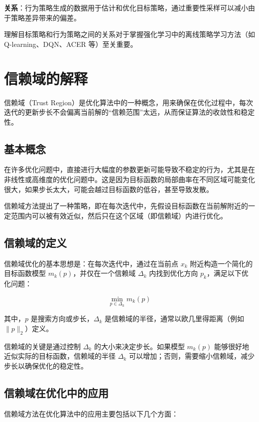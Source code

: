 \documentclass[twocolumn, 10pt]{article} %
\theoremstyle{remark}
\begin{document}
\textbf{关系}：行为策略生成的数据用于估计和优化目标策略，通过重要性采样可以减小由于策略差异带来的偏差。

理解目标策略和行为策略之间的关系对于掌握强化学习中的离线策略学习方法（如 Q-learning、DQN、ACER 等）至关重要。



\section{信赖域的解释}

信赖域（Trust Region）是优化算法中的一种概念，用来确保在优化过程中，每次迭代的更新步长不会偏离当前解的“信赖范围”太远，从而保证算法的收敛性和稳定性。

\subsection{基本概念}

在许多优化问题中，直接进行大幅度的参数更新可能导致不稳定的行为，尤其是在非线性或高维度的优化问题中。这是因为目标函数的局部曲率在不同区域可能变化很大，如果步长太大，可能会越过目标函数的低谷，甚至导致发散。

信赖域方法提出了一种策略，即在每次迭代中，先假设目标函数在当前解附近的一定范围内可以被有效近似，然后只在这个区域（即信赖域）内进行优化。

\subsection{信赖域的定义}

信赖域优化的基本思想是：在每次迭代中，通过在当前点 \( x_k \) 附近构造一个简化的目标函数模型 \( m_k(p) \)，并仅在一个信赖域 \( \Delta_k \) 内找到优化方向 \( p_k \)，满足以下优化问题：

\[
\min_{p \in \Delta_k} m_k(p)
\]

其中，\( p \) 是搜索方向或步长，\( \Delta_k \) 是信赖域的半径，通常以欧几里得距离（例如 \( \|p\|_2 \)）定义。

信赖域的关键是通过控制 \( \Delta_k \) 的大小来决定步长。如果模型 \( m_k(p) \) 能够很好地近似实际的目标函数，信赖域的半径 \( \Delta_k \) 可以增加；否则，需要缩小信赖域，减少步长以确保优化的稳定性。

\subsection{信赖域在优化中的应用}

信赖域方法在优化算法中的应用主要包括以下几个方面：
\end{document}
